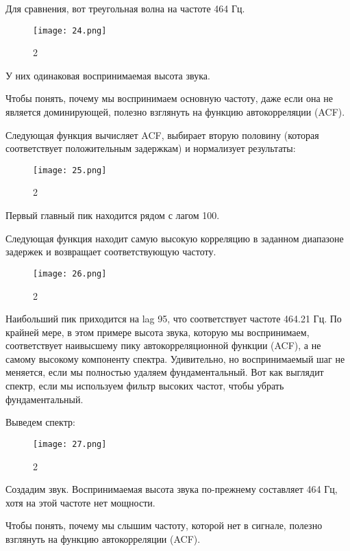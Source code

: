 \documentclass[10pt,a4paper,oneside]{article}
\begin{document}
Для сравнения, вот треугольная волна на частоте 464 Гц.

\begin{figure}[H]
        \centering
        \texttt{[image: 24.png]}
        \caption{2}
        \label{fig:first}
\end{figure}

У них одинаковая воспринимаемая высота звука.

Чтобы понять, почему мы воспринимаем основную частоту, даже если она не является доминирующей, полезно взглянуть на функцию автокорреляции (ACF).

Следующая функция вычисляет ACF, выбирает вторую половину (которая соответствует положительным задержкам) и нормализует результаты:

\begin{figure}[H]
        \centering
        \texttt{[image: 25.png]}
        \caption{2}
        \label{fig:first}
\end{figure}

Первый главный пик находится рядом с лагом 100.

Следующая функция находит самую высокую корреляцию в заданном диапазоне задержек и возвращает соответствующую частоту.

\begin{figure}[H]
        \centering
        \texttt{[image: 26.png]}
        \caption{2}
        \label{fig:first}
\end{figure}

Наибольший пик приходится на lag 95, что соответствует частоте 464.21 Гц. По крайней мере, в этом примере высота звука, которую мы воспринимаем, соответствует наивысшему пику автокорреляционной функции (ACF), а не самому высокому компоненту спектра. Удивительно, но воспринимаемый шаг не меняется, если мы полностью удаляем фундаментальный. Вот как выглядит спектр, если мы используем фильтр высоких частот, чтобы убрать фундаментальный.

Выведем спектр: 

\begin{figure}[H]
        \centering
        \texttt{[image: 27.png]}
        \caption{2}
        \label{fig:first}
\end{figure}

Создадим звук. Воспринимаемая высота звука по-прежнему составляет 464 Гц, хотя на этой частоте нет мощности.

Чтобы понять, почему мы слышим частоту, которой нет в сигнале, полезно взглянуть на функцию автокорреляции (ACF).
\end{document}
